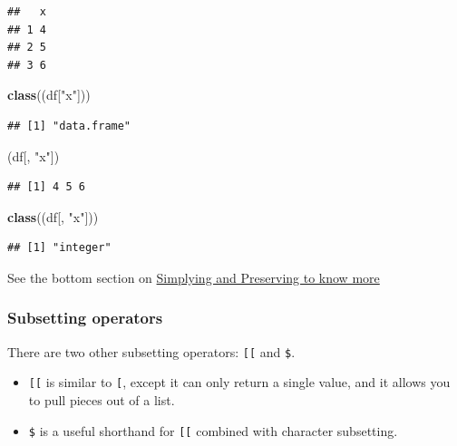 \documentclass[
]{book}
\newenvironment{Shaded}{\begin{snugshade}}{\end{snugshade}}
\newcommand{\FunctionTok}[1]{\textcolor[rgb]{0.13,0.29,0.53}{\textbf{#1}}}
\newcommand{\NormalTok}[1]{#1}
\newcommand{\StringTok}[1]{\textcolor[rgb]{0.31,0.60,0.02}{#1}}
\providecommand{\tightlist}{%
  \setlength{\itemsep}{0pt}\setlength{\parskip}{0pt}}
\begin{document}
\begin{verbatim}
##   x
## 1 4
## 2 5
## 3 6
\end{verbatim}

\begin{Shaded}
\begin{Highlighting}[]
\FunctionTok{class}\NormalTok{((df[}\StringTok{"x"}\NormalTok{]))}
\end{Highlighting}
\end{Shaded}

\begin{verbatim}
## [1] "data.frame"
\end{verbatim}

\begin{Shaded}
\begin{Highlighting}[]
\NormalTok{(df[, }\StringTok{"x"}\NormalTok{])}
\end{Highlighting}
\end{Shaded}

\begin{verbatim}
## [1] 4 5 6
\end{verbatim}

\begin{Shaded}
\begin{Highlighting}[]
\FunctionTok{class}\NormalTok{((df[, }\StringTok{"x"}\NormalTok{]))}
\end{Highlighting}
\end{Shaded}

\begin{verbatim}
## [1] "integer"
\end{verbatim}

See the bottom section on \hyperref[simplify-preserve]{Simplying and Preserving to know more}

\subsubsection{Subsetting operators}\label{subsetting-operators}

There are two other subsetting operators: \texttt{{[}{[}} and \texttt{\$}.

\begin{itemize}
\tightlist
\item
  \texttt{{[}{[}} is similar to \texttt{{[}}, except it can only return a single value, and it allows you to pull pieces out of a list.
\item
  \texttt{\$} is a useful shorthand for \texttt{{[}{[}} combined with character subsetting.
\end{itemize}
\end{document}
